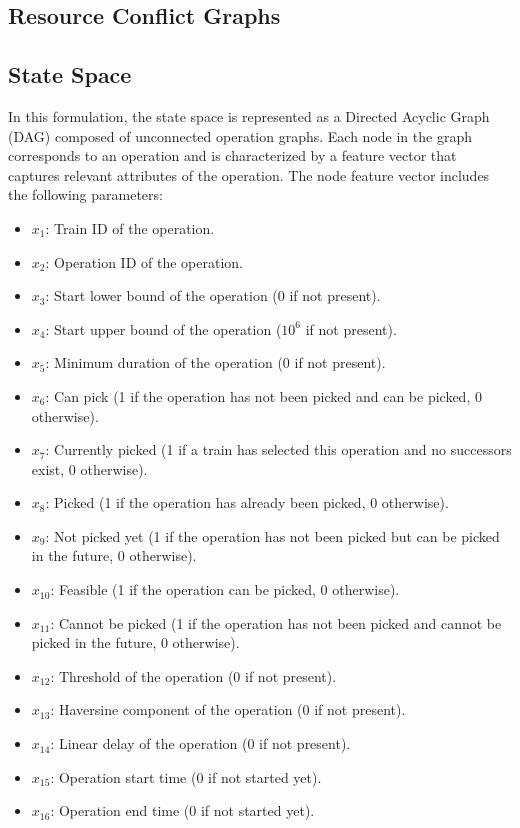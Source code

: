 \documentclass[runningheads]{llncs}
\begin{document}
\subsection{Resource Conflict Graphs}
\label{sss:resource_conflicts}


\subsection{State Space}
\label{sss:state_space}

In this formulation, the state space is represented as a Directed Acyclic Graph (DAG) composed of unconnected operation graphs. 
Each node in the graph corresponds to an operation and is characterized by a feature vector that captures relevant attributes of the operation. 
The node feature vector includes the following parameters:

\begin{itemize}
    \item $x_1$: Train ID of the operation.
    \item $x_2$: Operation ID of the operation.
    \item $x_3$: Start lower bound of the operation (0 if not present).
    \item $x_4$: Start upper bound of the operation ($10^6$ if not present).
    \item $x_5$: Minimum duration of the operation (0 if not present).
    \item $x_6$: Can pick (1 if the operation has not been picked and can be picked, 0 otherwise).
    \item $x_7$: Currently picked (1 if a train has selected this operation and no successors exist, 0 otherwise).
    \item $x_8$: Picked (1 if the operation has already been picked, 0 otherwise).
    \item $x_9$: Not picked yet (1 if the operation has not been picked but can be picked in the future, 0 otherwise).
    \item $x_{10}$: Feasible (1 if the operation can be picked, 0 otherwise).
    \item $x_{11}$: Cannot be picked (1 if the operation has not been picked and cannot be picked in the future, 0 otherwise).
    \item $x_{12}$: Threshold of the operation (0 if not present).
    \item $x_{13}$: Haversine component of the operation (0 if not present).
    \item $x_{14}$: Linear delay of the operation (0 if not present).
    \item $x_{15}$: Operation start time (0 if not started yet).
    \item $x_{16}$: Operation end time (0 if not started yet).
\end{itemize}
\end{document}
